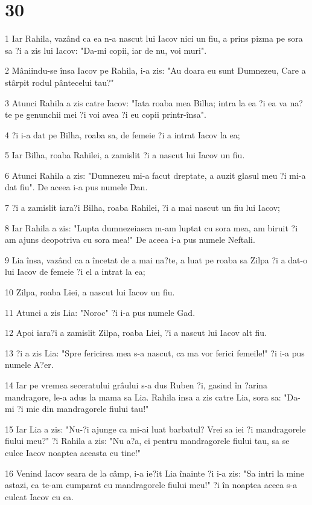 \chapter{30}

\par 1 Iar Rahila, vazând ca ea n-a nascut lui Iacov nici un fiu, a prins pizma pe sora sa ?i a zis lui Iacov: "Da-mi copii, iar de nu, voi muri".
\par 2 Mâniindu-se însa Iacov pe Rahila, i-a zis: "Au doara eu sunt Dumnezeu, Care a stârpit rodul pântecelui tau?"
\par 3 Atunci Rahila a zis catre Iacov: "Iata roaba mea Bilha; intra la ea ?i ea va na?te pe genunchii mei ?i voi avea ?i eu copii printr-însa".
\par 4 ?i i-a dat pe Bilha, roaba sa, de femeie ?i a intrat Iacov la ea;
\par 5 Iar Bilha, roaba Rahilei, a zamislit ?i a nascut lui Iacov un fiu.
\par 6 Atunci Rahila a zis: "Dumnezeu mi-a facut dreptate, a auzit glasul meu ?i mi-a dat fiu". De aceea i-a pus numele Dan.
\par 7 ?i a zamislit iara?i Bilha, roaba Rahilei, ?i a mai nascut un fiu lui Iacov;
\par 8 Iar Rahila a zis: "Lupta dumnezeiasca m-am luptat cu sora mea, am biruit ?i am ajuns deopotriva cu sora mea!" De aceea i-a pus numele Neftali.
\par 9 Lia însa, vazând ca a încetat de a mai na?te, a luat pe roaba sa Zilpa ?i a dat-o lui Iacov de femeie ?i el a intrat la ea;
\par 10 Zilpa, roaba Liei, a nascut lui Iacov un fiu.
\par 11 Atunci a zis Lia: "Noroc" ?i i-a pus numele Gad.
\par 12 Apoi iara?i a zamislit Zilpa, roaba Liei, ?i a nascut lui Iacov alt fiu.
\par 13 ?i a zis Lia: "Spre fericirea mea s-a nascut, ca ma vor ferici femeile!" ?i i-a pus numele A?er.
\par 14 Iar pe vremea seceratului grâului s-a dus Ruben ?i, gasind în ?arina mandragore, le-a adus la mama sa Lia. Rahila insa a zis catre Lia, sora sa: "Da-mi ?i mie din mandragorele fiului tau!"
\par 15 Iar Lia a zis: "Nu-?i ajunge ca mi-ai luat barbatul? Vrei sa iei ?i mandragorele fiului meu?" ?i Rahila a zis: "Nu a?a, ci pentru mandragorele fiului tau, sa se culce Iacov noaptea aceasta cu tine!"
\par 16 Venind Iacov seara de la câmp, i-a ie?it Lia înainte ?i i-a zis: "Sa intri la mine astazi, ca te-am cumparat cu mandragorele fiului meu!" ?i în noaptea aceea s-a culcat Iacov cu ea.
